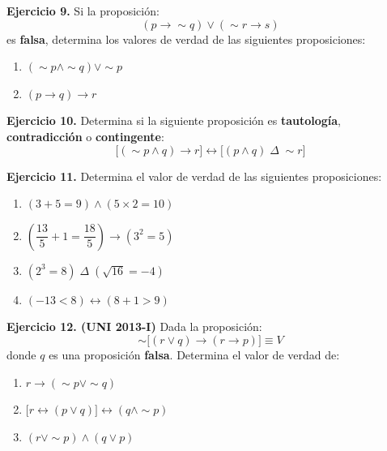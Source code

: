 \documentclass[12pt,a4paper]{article}
\newcommand{\espacioresp}[1][3cm]{\vspace{#1}}
\begin{document}
\espacioresp[6cm]

\begin{ejerciciobox}
\textbf{Ejercicio 9.}
Si la proposición:
\[
(p \rightarrow \sim q) \vee (\sim r \rightarrow s)
\]
es \textbf{falsa}, determina los valores de verdad de las siguientes proposiciones:
\begin{enumerate}[label=\Roman*.]
  \item $(\sim p \wedge \sim q) \vee \sim p$
  \item $(p \rightarrow q) \rightarrow r$
\end{enumerate}
\end{ejerciciobox}

\espacioresp[6cm]

\begin{ejerciciobox}
\textbf{Ejercicio 10.}
Determina si la siguiente proposición es \textbf{tautología}, \textbf{contradicción} o
\textbf{contingente}:
\[
\bigl[(\sim p \wedge q) \rightarrow r\bigr] \leftrightarrow \bigl[(p \wedge q) \;\Delta\; \sim r\bigr]
\]
\end{ejerciciobox}

\espacioresp[6cm]

\newpage

\begin{ejerciciobox}
\textbf{Ejercicio 11.}
Determina el valor de verdad de las siguientes proposiciones:
\begin{enumerate}[label=\alph*)]
  \item $(3 + 5 = 9) \wedge (5 \times 2 = 10)$
  \item $\left(\dfrac{13}{5} + 1 = \dfrac{18}{5}\right) \rightarrow (3^2 = 5)$
  \item $(2^3 = 8) \;\Delta\; (\sqrt{16} = -4)$
  \item $(-13 < 8) \leftrightarrow (8 + 1 > 9)$
\end{enumerate}
\end{ejerciciobox}

\espacioresp[5cm]

\begin{ejerciciobox}
\textbf{Ejercicio 12. \small(UNI 2013-I)}
Dada la proposición:
\[
\sim\bigl[(r \vee q) \rightarrow (r \rightarrow p)\bigr] \equiv V
\]
donde $q$ es una proposición \textbf{falsa}. Determina el valor de verdad de:
\begin{enumerate}[label=\Roman*.]
  \item $r \rightarrow (\sim p \vee \sim q)$
  \item $\bigl[r \leftrightarrow (p \vee q)\bigr] \leftrightarrow (q \wedge \sim p)$
  \item $(r \vee \sim p) \wedge (q \vee p)$
\end{enumerate}
\end{ejerciciobox}
\end{document}
